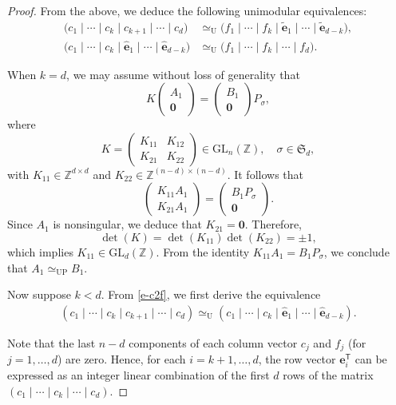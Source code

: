 \documentclass[10pt,a4paper]{amsart}
\begin{document}
\begin{proof}
From the above, we deduce the following unimodular equivalences:
\begin{align}
\big( c_1 \mid \cdots \mid c_k \mid c_{k+1} \mid \cdots \mid c_{d} \big) &\simeq_{\mathrm{U}} \big( f_1 \mid \cdots \mid f_k \mid \widetilde{\mathbf{e}}_{1} \mid \cdots \mid \widetilde{\mathbf{e}}_{d-k} \big), \label{e-c2f} \\
\big( c_1 \mid \cdots \mid c_k \mid \widehat{\mathbf{e}}_{1} \mid \cdots \mid \widehat{\mathbf{e}}_{d-k} \big) &\simeq_{\mathrm{U}} \big( f_1 \mid \cdots \mid f_k \mid \cdots \mid f_{d} \big). \label{e-f2c}
\end{align}

When $k = d$, we may assume without loss of generality that
\[
K \begin{pmatrix} A_1 \\ \mathbf{0} \end{pmatrix} = \begin{pmatrix} B_1 \\ \mathbf{0} \end{pmatrix} P_\sigma,
\]
where
\[
K = \begin{pmatrix} K_{11} & K_{12} \\ K_{21} & K_{22} \end{pmatrix} \in \mathrm{GL}_n(\mathbb{Z}), \quad \sigma \in \mathfrak{S}_d,
\]
with $K_{11} \in \mathbb{Z}^{d \times d}$ and $K_{22} \in \mathbb{Z}^{(n-d) \times (n-d)}$.
It follows that
\[
\begin{pmatrix} K_{11}A_1 \\ K_{21}A_1 \end{pmatrix} = \begin{pmatrix} B_1P_\sigma \\ \mathbf{0} \end{pmatrix}.
\]
Since $A_1$ is nonsingular, we deduce that $K_{21} = \mathbf{0}$. Therefore,
\[
\det(K) = \det(K_{11})\det(K_{22}) = \pm 1,
\]
which implies $K_{11} \in \mathrm{GL}_d(\mathbb{Z})$. From the identity $K_{11}A_1 = B_1P_\sigma$, we conclude that $A_1 \simeq_{\mathrm{UP}} B_1$.


Now suppose $k < d$. From \eqref{e-c2f}, we first derive the equivalence
\begin{align}
\label{e-c2cp}
(c_1 \mid \cdots \mid c_k \mid c_{k+1} \mid \cdots \mid c_d) \simeq_{\mathrm{U}} (c_1 \mid \cdots \mid c_k \mid \widehat{\mathbf{e}}_1 \mid \cdots \mid \widehat{\mathbf{e}}_{d-k}).
\end{align}

Note that the last $n - d$ components of each column vector $c_j$ and $f_j$ (for $j = 1, \dots, d$) are zero. Hence, for each $i = k+1, \dots, d$, the row vector $\mathbf{e}_i^\mathsf{T}$ can be expressed as an integer linear combination of the first \(d\) rows of the matrix \((c_1 \mid \cdots \mid c_k \mid \cdots \mid c_{d})\).


\end{proof}
\end{document}
